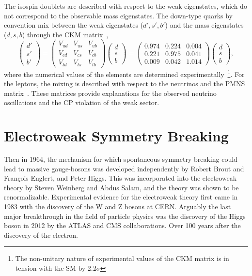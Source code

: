 The isospin doublets are described with respect to the weak eigenstates, which do not correspond to the observable mass eigenstates.
The down-type quarks by convention mix between the weak eigenstates ($d', s', b'$) and the mass eigenstates ($d, s, b$) through the CKM matrix~\cite{cabibbo1963},
\begin{equation}
	\label{eq:ckm_matrix}
	\begin{pmatrix} d' \\ s' \\ b' \end{pmatrix} =
	\begin{pmatrix} V_{ud} & V_{us} & V_{ub} \\ V_{cd} & V_{cs} & V_{cb} \\ V_{td} & V_{ts} & V_{tb} \end{pmatrix} \begin{pmatrix} d \\ s \\ b \end{pmatrix} =
	\begin{pmatrix} 0.974 & 0.224 & 0.004 \\ 0.221 & 0.975 & 0.041 \\ 0.009 & 0.042 & 1.014 \end{pmatrix} \begin{pmatrix} d \\ s \\ b \end{pmatrix},
\end{equation}
where the numerical values of the elements are determined experimentally~\cite{ParticleDataGroup}\footnote{The non-unitary nature of experimental values of the CKM matrix is in tension with the SM by 2.2$\sigma$}.
For the leptons, the mixing is described with respect to the neutrinos and the PMNS matrix~\cite{pontecorvo1967, maki1962}.
These matrices provide explanations for the observed neutrino oscillations and the CP violation of the weak sector.

\section{Electroweak Symmetry Breaking}
\label{sec:higgs}

Then in 1964, the mechanism for which spontaneous symmetry breaking could lead to massive gauge-bosons was developed independently by Robert Brout and François Englert, and Peter Higgs.
This was incorporated into the electroweak theory by Steven Weinberg and Abdus Salam, and the theory was shown to be renormalizable.
Experimental evidence for the electroweak theory first came in 1983 with the discovery of the W and Z bosons at CERN.
Arguably the last major breakthrough in the field of particle physics was the discovery of the Higgs boson in 2012 by the ATLAS and CMS collaborations.
Over 100 years after the discovery of the electron.

